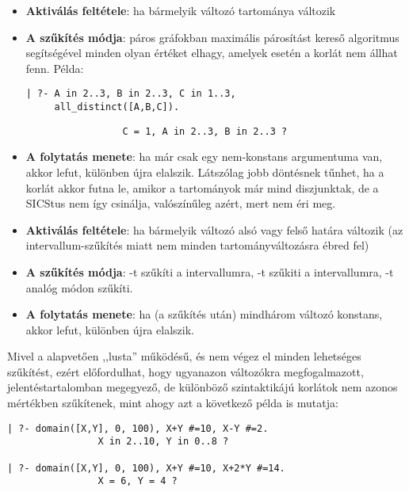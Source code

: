 \begin{itemize}
\item {\bf Aktiválás feltétele}: ha bármelyik változó tartománya változik
\item {\bf A szűkítés módja}: páros gráfokban maximális párosítást kereső
algoritmus segítségével minden olyan értéket elhagy, amelyek esetén a korlát nem
állhat fenn. Példa:
\begin{verbatim}
| ?- A in 2..3, B in 2..3, C in 1..3, 
     all_distinct([A,B,C]).
\end{verbatim}
\begin{verbatim}
                 C = 1, A in 2..3, B in 2..3 ? 
\end{verbatim}
\item {\bf A folytatás menete}: ha már csak egy nem-konstans argumentuma van,
akkor lefut, különben újra elalszik. Látszólag jobb döntésnek tűnhet, ha a korlát
akkor futna le, amikor a tartományok már mind diszjunktak, de a SICStus nem így
csinálja, valószínűleg azért, mert nem éri meg.
\end{itemize}

\begin{itemize}
\item {\bf Aktiválás feltétele}: ha bármelyik változó alsó vagy felső határa változik (az
intervallum-szűkítés miatt nem minden tartományváltozásra ébred fel)
\item {\bf A szűkítés módja}: -t szűkíti a  intervallumra, -t szűkiti a  intervallumra, -t analóg módon szűkíti.
\item {\bf A folytatás menete}: ha (a szűkítés után) mindhárom változó konstans, akkor lefut,
különben újra elalszik.
\end{itemize}

Mivel a \clpfd alapvetően ,,lusta'' működésű, és nem végez el minden lehetséges
szűkítést, ezért előfordulhat, hogy ugyanazon változókra megfogalmazott, jelentéstartalomban
megegyező, de különböző szintaktikájú korlátok nem azonos mértékben szűkítenek,
mint ahogy azt a következő példa is mutatja:

\begin{verbatim}
| ?- domain([X,Y], 0, 100), X+Y #=10, X-Y #=2.
                X in 2..10, Y in 0..8 ? 

| ?- domain([X,Y], 0, 100), X+Y #=10, X+2*Y #=14.
                X = 6, Y = 4 ? 
\end{verbatim}

